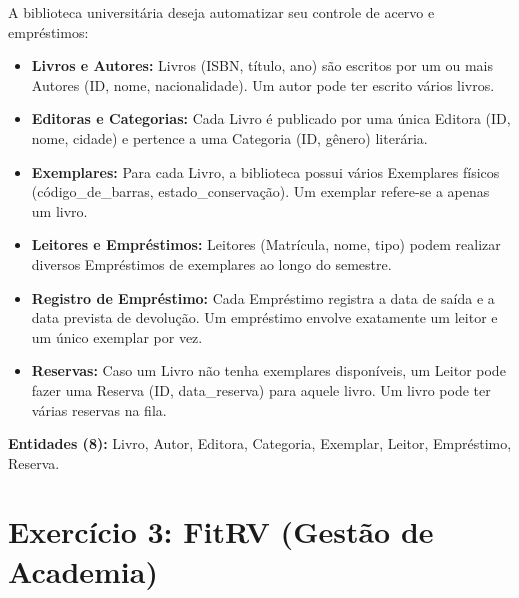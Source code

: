 \documentclass[12pt,a4paper]{article}
\newcommand{\resposta}[1]{
\noindent
\framebox[\textwidth]{
\begin{minipage}{0.98\textwidth}
\vspace{#1}
\end{minipage}
}
}
\begin{document}
A biblioteca universitária deseja automatizar seu controle de acervo e empréstimos:
\begin{itemize}
    \item \textbf{Livros e Autores:} Livros (ISBN, título, ano) são escritos por um ou mais Autores (ID, nome, nacionalidade). Um autor pode ter escrito vários livros.
    \item \textbf{Editoras e Categorias:} Cada Livro é publicado por uma única Editora (ID, nome, cidade) e pertence a uma Categoria (ID, gênero) literária.
    \item \textbf{Exemplares:} Para cada Livro, a biblioteca possui vários Exemplares físicos (código\_de\_barras, estado\_conservação). Um exemplar refere-se a apenas um livro.
    \item \textbf{Leitores e Empréstimos:} Leitores (Matrícula, nome, tipo) podem realizar diversos Empréstimos de exemplares ao longo do semestre.
    \item \textbf{Registro de Empréstimo:} Cada Empréstimo registra a data de saída e a data prevista de devolução. Um empréstimo envolve exatamente um leitor e um único exemplar por vez.
    \item \textbf{Reservas:} Caso um Livro não tenha exemplares disponíveis, um Leitor pode fazer uma Reserva (ID, data\_reserva) para aquele livro. Um livro pode ter várias reservas na fila.
\end{itemize}

\textbf{Entidades (8):} Livro, Autor, Editora, Categoria, Exemplar, Leitor, Empréstimo, Reserva.

\resposta{12cm}

\newpage

\section*{Exercício 3: FitRV (Gestão de Academia)}
\end{document}

